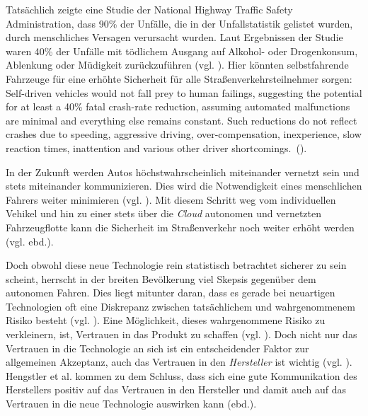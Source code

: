 Tatsächlich zeigte eine Studie der National Highway Traffic Safety Administration, dass 90\% der Unfälle, die in der Unfallstatistik gelistet wurden, durch menschliches Versagen verursacht wurden. Laut Ergebnissen der Studie waren 40\% der Unfälle mit tödlichem Ausgang auf Alkohol- oder Drogenkonsum, Ablenkung oder Müdigkeit zurückzuführen (vgl. \cite{singh2015critical}). Hier könnten selbstfahrende Fahrzeuge für eine erhöhte Sicherheit für alle Straßenverkehrsteilnehmer sorgen: \glqq Self-driven vehicles would not fall prey to human failings, suggesting the potential for at least a 40\% fatal crash-rate reduction, assuming automated malfunctions are minimal and everything else remains constant. Such reductions do not reflect crashes due to speeding, aggressive driving, over-compensation, inexperience, slow reaction times, inattention and various other driver shortcomings.\grqq \ (\cite[169]{fagnant2015preparing}).

In der Zukunft werden Autos höchstwahrscheinlich miteinander vernetzt sein und stets miteinander kommunizieren. Dies wird die Notwendigkeit eines menschlichen Fahrers weiter minimieren (vgl. \cite[241]{gerla2014internet}). Mit diesem Schritt weg vom individuellen Vehikel und hin zu einer stets über die \emph{Cloud} autonomen und vernetzten Fahrzeugflotte kann die Sicherheit im Straßenverkehr noch weiter erhöht werden (vgl. ebd.).

Doch obwohl diese neue Technologie rein statistisch betrachtet sicherer zu sein scheint, herrscht in der breiten Bevölkerung viel Skepsis gegenüber dem autonomen Fahren. Dies liegt mitunter daran, dass es gerade bei neuartigen Technologien oft eine Diskrepanz zwischen tatsächlichem und wahrgenommenem Risiko besteht (vgl. \cite[106]{hengstler2016applied}). Eine Möglichkeit, dieses wahrgenommene Risiko zu verkleinern, ist, Vertrauen in das Produkt zu schaffen (vgl. \cite{rousseau1998not}). Doch nicht nur das Vertrauen in die Technologie an sich ist ein entscheidender Faktor zur allgemeinen Akzeptanz, auch das Vertrauen in den \emph{Hersteller} ist wichtig (vgl. \cite[107]{hengstler2016applied}). Hengstler et al. kommen zu dem Schluss, dass sich eine gute Kommunikation des Herstellers positiv auf das Vertrauen in den Hersteller und damit auch auf das Vertrauen in die neue Technologie auswirken kann (ebd.).
